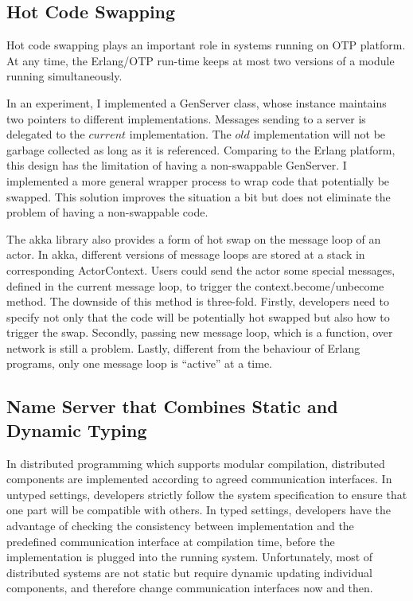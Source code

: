 \subsection{Hot Code Swapping}
Hot code swapping plays an important role in systems running on OTP platform.  At any time, the Erlang/OTP run-time keeps at most two versions of a module running simultaneously.

In an experiment, I implemented a GenServer class, whose instance maintains two pointers to different implementations.  Messages sending to a server is delegated to the $current$ implementation.  The $old$ implementation will not be garbage collected as long as it is referenced.  Comparing to the Erlang platform, this design has the limitation of having a non-swappable GenServer.  I implemented a more general wrapper process to wrap code that potentially be swapped.  This solution improves the situation a bit but does not eliminate the problem of having a non-swappable code.

The akka library \cite{akka} also provides a form of hot swap on the message loop of an actor.  In akka, different versions of message loops are stored at a stack in corresponding ActorContext.  Users could send the actor some special messages, defined in the current message loop, to trigger the context.become/unbecome method.  The downside of this method is three-fold.  Firstly, developers need to specify not only that the code will be potentially hot swapped but also how to trigger the swap.  Secondly, passing new message loop, which is a function, over network is still a problem.  Lastly, different from the behaviour of Erlang programs, only one message loop is ``active'' at a time.





\subsection{Name Server that Combines Static and Dynamic Typing}
In distributed programming which supports modular compilation, distributed components are implemented according to agreed communication interfaces.  In untyped settings, developers strictly follow the system specification to ensure that one part will be compatible with others.  In typed settings, developers have the advantage of checking the consistency between implementation and the predefined communication interface at compilation time, before the implementation is plugged into the running system.  Unfortunately, most of distributed systems are not static but require dynamic updating individual components, and therefore change communication interfaces now and then.  


